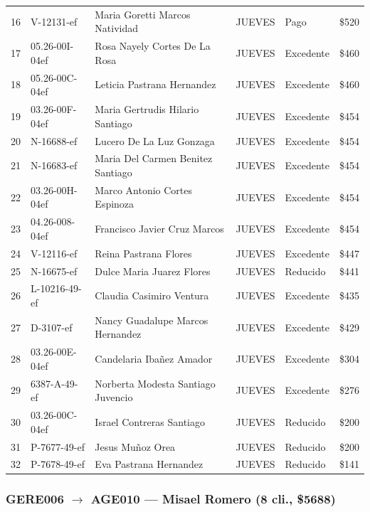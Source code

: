 \documentclass[11pt,a4paper]{article}
\newcommand{\money}[1]{\$\num{#1}}
\begin{document}
\begin{center}
\begin{longtable}{rlp{5.5cm}llr}
16 & V-12131-ef & Maria Goretti Marcos Natividad & JUEVES & Pago & \money{520} \\
17 & 05.26-00I-04ef & Rosa Nayely Cortes De La Rosa & JUEVES & Excedente & \money{460} \\
18 & 05.26-00C-04ef & Leticia Pastrana Hernandez & JUEVES & Excedente & \money{460} \\
19 & 03.26-00F-04ef & Maria Gertrudis Hilario Santiago & JUEVES & Excedente & \money{454} \\
20 & N-16688-ef & Lucero De La Luz Gonzaga & JUEVES & Excedente & \money{454} \\
21 & N-16683-ef & Maria Del Carmen Benitez Santiago & JUEVES & Excedente & \money{454} \\
22 & 03.26-00H-04ef & Marco Antonio Cortes Espinoza & JUEVES & Excedente & \money{454} \\
23 & 04.26-008-04ef & Francisco Javier Cruz Marcos & JUEVES & Excedente & \money{454} \\
24 & V-12116-ef & Reina Pastrana Flores & JUEVES & Excedente & \money{447} \\
25 & N-16675-ef & Dulce Maria Juarez Flores & JUEVES & Reducido & \money{441} \\
26 & L-10216-49-ef & Claudia Casimiro Ventura & JUEVES & Excedente & \money{435} \\
27 & D-3107-ef & Nancy Guadalupe Marcos Hernandez & JUEVES & Excedente & \money{429} \\
28 & 03.26-00E-04ef & Candelaria Ibañez Amador & JUEVES & Excedente & \money{304} \\
29 & 6387-A-49-ef & Norberta Modesta Santiago Juvencio & JUEVES & Excedente & \money{276} \\
30 & 03.26-00C-04ef & Israel Contreras Santiago & JUEVES & Reducido & \money{200} \\
31 & P-7677-49-ef & Jesus Muñoz Orea & JUEVES & Reducido & \money{200} \\
32 & P-7678-49-ef & Eva Pastrana Hernandez & JUEVES & Reducido & \money{141} \\

\bottomrule
\end{longtable}
\end{center}
\subsubsection{GERE006 $\rightarrow$ AGE010 --- Misael Romero (8 cli., \money{5688})}
\end{document}
